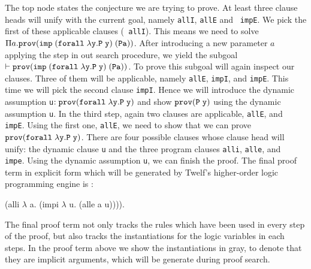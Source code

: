 \documentclass{acmconf}
\newcommand{\mygray}{\color{green}}
\newcommand{\fighead}{\hrule\vspace{1.5ex}}
\newcommand{\pfLF}{\tt{prov}}
\newcommand{\impLF}{\tt{imp}\;}
\newcommand{\forallLF}{\tt{forall}\;}
\newcommand{\vd}{\vdash}
\begin{document}
The top node states the conjecture we are trying to prove. At least three clause heads will
unify with the current goal, namely {\tt allI}, {\tt allE} and {\tt
  impE}. We pick the first of these applicable clauses ({\tt
  allI}). This means we need to solve $\Pi a. \pfLF ( \impLF (\forallLF \lambda
y. P\; y)\; (P a))$. After introducing a new parameter $a$
applying the {} step in out search procedure, we yield
the subgoal $\vd \pfLF ( \impLF (\forallLF \lambda y. P\; y)\; (P a))$.
To prove this subgoal will again inspect our clauses. Three of them will
be applicable, namely {\tt allE}, {\tt impI}, and {\tt impE}. This
time we will pick the second clause {\tt impI}. Hence we will
introduce the dynamic assumption {\tt{u}}$ : \pfLF (\forallLF \lambda y. P\; y)$
and show $\pfLF (P\; y)$ using the dynamic assumption {\tt{u}}. In the third step,
again two clauses are applicable,  {\tt allE}, and {\tt
  impE}. Using the first one, {\tt allE}, we need to show that we can
prove $\pfLF (\forallLF \lambda y. P\; y)$. There are four
possible clauses whose clause head will unify: the dynamic clause
{\tt u} and the three program clauses {\tt alli}, {\tt alle}, and {\tt
  impe}. Using the dynamic assumption {\tt u}, we can finish the
proof. The final proof term in explicit form which will be generated by Twelf's
higher-order logic programming engine is : 

\begin{code}
(alli {\mygray{($\lambda\!\!$ x. ((forall $\lambda\!\!$ y. P y) imp P x))}}
   $\lambda\!\!$ a. (impi {\mygray{(forall $\lambda\!\!$ y.P y) (P a)}}
           $\lambda\!\!$ u. (alle {\mygray{($\lambda\!\!$ y.P y)}} a u)))).
\end{code}

The final proof term not only tracks the rules which have been used in
every step of the proof, but also tracks the instantiations for the logic
variables in each steps. In the proof term above we show the
instantiations in gray, to denote that they are implicit arguments,
which will be generate during proof search.



\end{document}
